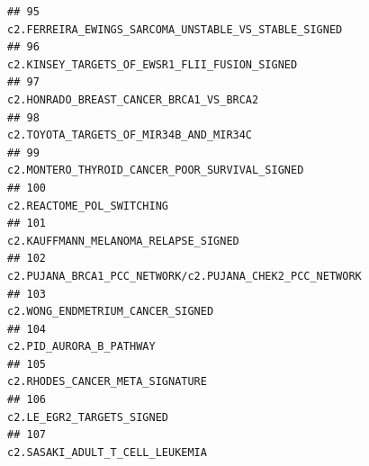 \documentclass{article}\usepackage[]{graphicx}\usepackage[]{color}
\makeatletter
\newenvironment{kframe}{%
 \def\at@end@of@kframe{}%
 \ifinner\ifhmode%
  \def\at@end@of@kframe{\end{minipage}}%
  \begin{minipage}{\columnwidth}%
 \fi\fi%
 \def\FrameCommand##1{\hskip\@totalleftmargin \hskip-\fboxsep
 \colorbox{shadecolor}{##1}\hskip-\fboxsep
     \hskip-\linewidth \hskip-\@totalleftmargin \hskip\columnwidth}%
 \MakeFramed {\advance\hsize-\width
   \@totalleftmargin\z@ \linewidth\hsize
   \@setminipage}}%
 {\par\unskip\endMakeFramed%
 \at@end@of@kframe}
\newenvironment{knitrout}{}{} %
\makeatother
\begin{document}
\begin{knitrout}
\begin{kframe}
\begin{verbatim}
## 95                                                                                                                                                              c2.FERREIRA_EWINGS_SARCOMA_UNSTABLE_VS_STABLE_SIGNED
## 96                                                                                                                                                                     c2.KINSEY_TARGETS_OF_EWSR1_FLII_FUSION_SIGNED
## 97                                                                                                                                                                           c2.HONRADO_BREAST_CANCER_BRCA1_VS_BRCA2
## 98                                                                                                                                                                            c2.TOYOTA_TARGETS_OF_MIR34B_AND_MIR34C
## 99                                                                                                                                                                    c2.MONTERO_THYROID_CANCER_POOR_SURVIVAL_SIGNED
## 100                                                                                                                                                                                        c2.REACTOME_POL_SWITCHING
## 101                                                                                                                                                                             c2.KAUFFMANN_MELANOMA_RELAPSE_SIGNED
## 102                                                                                                                                                          c2.PUJANA_BRCA1_PCC_NETWORK/c2.PUJANA_CHEK2_PCC_NETWORK
## 103                                                                                                                                                                                 c2.WONG_ENDMETRIUM_CANCER_SIGNED
## 104                                                                                                                                                                                          c2.PID_AURORA_B_PATHWAY
## 105                                                                                                                                                                                  c2.RHODES_CANCER_META_SIGNATURE
## 106                                                                                                                                                                                        c2.LE_EGR2_TARGETS_SIGNED
## 107                                                                                                                                                                                  c2.SASAKI_ADULT_T_CELL_LEUKEMIA

\end{verbatim}
\end{kframe}
\end{knitrout}
\end{document}
